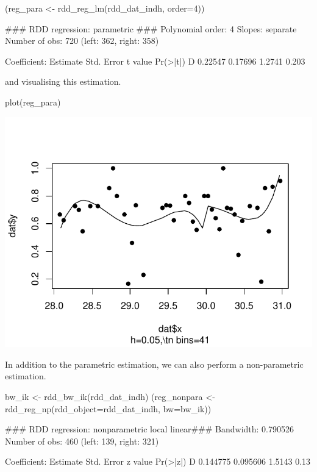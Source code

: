 \documentclass[article]{jss}
\begin{document}
\begin{CodeChunk}
\begin{CodeInput}
(reg_para <- rdd_reg_lm(rdd_dat_indh, order=4))
\end{CodeInput}
\begin{CodeOutput}
### RDD regression: parametric ###
    Polynomial order:  4 
    Slopes:  separate 
    Number of obs: 720 (left: 362, right: 358)

    Coefficient:
  Estimate Std. Error t value Pr(>|t|)
D  0.22547    0.17696  1.2741    0.203
\end{CodeOutput}
\end{CodeChunk}

and visualising this estimation.

\begin{CodeChunk}
\begin{CodeInput}
plot(reg_para)
\end{CodeInput}


\begin{center}\includegraphics{README_files/figure-latex/unnamed-chunk-9-1} \end{center}

\end{CodeChunk}

In addition to the parametric estimation, we can also perform a
non-parametric estimation.

\begin{CodeChunk}
\begin{CodeInput}
bw_ik <- rdd_bw_ik(rdd_dat_indh)
(reg_nonpara <- rdd_reg_np(rdd_object=rdd_dat_indh, bw=bw_ik))
\end{CodeInput}
\begin{CodeOutput}
### RDD regression: nonparametric local linear###
    Bandwidth:  0.790526 
    Number of obs: 460 (left: 139, right: 321)

    Coefficient:
  Estimate Std. Error z value Pr(>|z|)
D 0.144775   0.095606  1.5143     0.13
\end{CodeOutput}
\end{CodeChunk}
\end{document}

